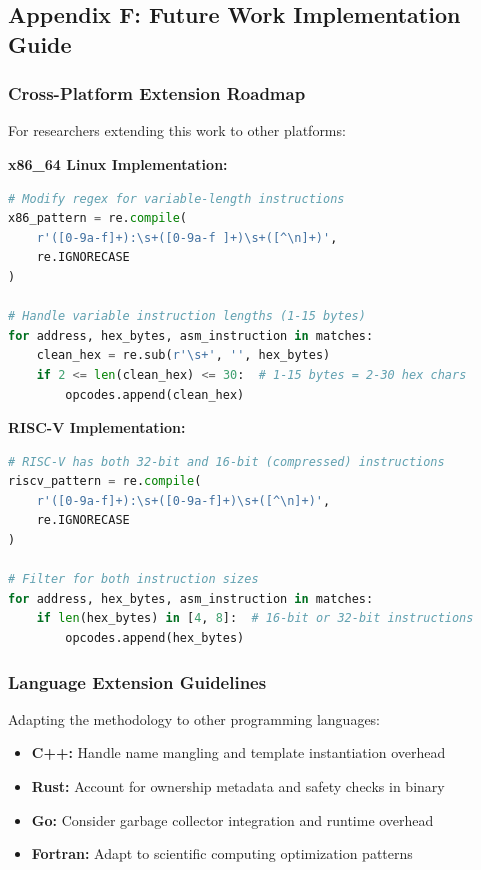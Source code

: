 \documentclass[11pt,a4paper]{article}
\begin{document}
\subsection{Appendix F: Future Work Implementation Guide}

\subsubsection{Cross-Platform Extension Roadmap}
For researchers extending this work to other platforms:

\textbf{x86\_64 Linux Implementation:}
\begin{lstlisting}[language=python, caption=Adaptation for x86\_64 architecture]
# Modify regex for variable-length instructions
x86_pattern = re.compile(
    r'([0-9a-f]+):\s+([0-9a-f ]+)\s+([^\n]+)', 
    re.IGNORECASE
)

# Handle variable instruction lengths (1-15 bytes)
for address, hex_bytes, asm_instruction in matches:
    clean_hex = re.sub(r'\s+', '', hex_bytes)
    if 2 <= len(clean_hex) <= 30:  # 1-15 bytes = 2-30 hex chars
        opcodes.append(clean_hex)
\end{lstlisting}

\textbf{RISC-V Implementation:}
\begin{lstlisting}[language=python, caption=RISC-V specific considerations]
# RISC-V has both 32-bit and 16-bit (compressed) instructions
riscv_pattern = re.compile(
    r'([0-9a-f]+):\s+([0-9a-f]+)\s+([^\n]+)', 
    re.IGNORECASE
)

# Filter for both instruction sizes
for address, hex_bytes, asm_instruction in matches:
    if len(hex_bytes) in [4, 8]:  # 16-bit or 32-bit instructions
        opcodes.append(hex_bytes)
\end{lstlisting}

\subsubsection{Language Extension Guidelines}
Adapting the methodology to other programming languages:

\begin{itemize}
    \item \textbf{C++:} Handle name mangling and template instantiation overhead
    \item \textbf{Rust:} Account for ownership metadata and safety checks in binary
    \item \textbf{Go:} Consider garbage collector integration and runtime overhead
    \item \textbf{Fortran:} Adapt to scientific computing optimization patterns
\end{itemize}
\end{document}
